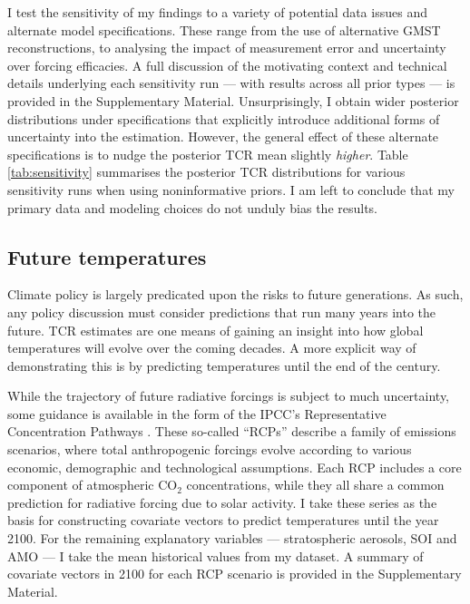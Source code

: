 \documentclass[smallextended]{svjour3}       %
\begin{document}
I test the sensitivity of my findings to a variety of potential data
issues and alternate model specifications. These range from the use of
alternative GMST reconstructions, to analysing the impact of measurement
error and uncertainty over forcing efficacies. A full discussion of the
motivating context and technical details underlying each sensitivity run
--- with results across all prior types --- is provided in the
Supplementary Material. Unsurprisingly, I obtain wider posterior
distributions under specifications that explicitly introduce additional
forms of uncertainty into the estimation. However, the general effect of
these alternate specifications is to nudge the posterior TCR mean
slightly \textit{higher}. Table \ref{tab:sensitivity} summarises the
posterior TCR distributions for various sensitivity runs when using
noninformative priors. I am left to conclude that my primary data and
modeling choices do not unduly bias the results.

\hypertarget{sec:future}{%
\subsection{Future temperatures}\label{sec:future}}

Climate policy is largely predicated upon the risks to future
generations. As such, any policy discussion must consider predictions
that run many years into the future. TCR estimates are one means of
gaining an insight into how global temperatures will evolve over the
coming decades. A more explicit way of demonstrating this is by
predicting temperatures until the end of the century.

While the trajectory of future radiative forcings is subject to much
uncertainty, some guidance is available in the form of the IPCC's
Representative Concentration Pathways \cite{van2011rcp}. These so-called
``RCPs'' describe a family of emissions scenarios, where total
anthropogenic forcings evolve according to various economic, demographic
and technological assumptions. Each RCP includes a core component of
atmospheric CO\(_2\) concentrations, while they all share a common
prediction for radiative forcing due to solar activity. I take these
series as the basis for constructing covariate vectors to predict
temperatures until the year 2100. For the remaining explanatory
variables --- stratospheric aerosols, SOI and AMO --- I take the mean
historical values from my dataset. A summary of covariate vectors in
2100 for each RCP scenario is provided in the Supplementary Material.
\end{document}
